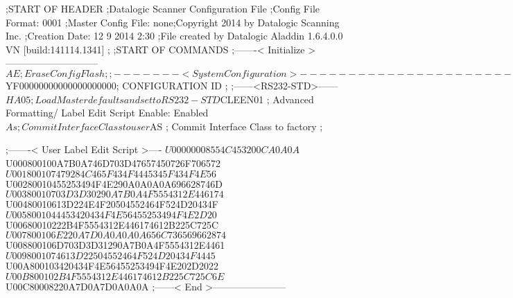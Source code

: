 ;START OF HEADER
;Datalogic Scanner Configuration File
;Config File Format: 0001
;Master Config File: none;Copyright 2014 by Datalogic Scanning Inc.
;Creation Date: 12 9 2014 2:30
;File created by Datalogic Aladdin 1.6.4.0.0 VN [build:141114.1341]
;
;START OF COMMANDS
;-------< Initialize >-----------------------------
$AE                 ; Erase Config Flash
;
;-------< System Configuration >-------------------------------
$YF00000000000000000000; CONFIGURATION ID
;
;------<RS232-STD>------
$HA05               ; Load Master defaults and set to RS232-STD
$CLEEN01            ; Advanced Formatting/ Label Edit Script Enable: Enabled
$As                 ; Commit Interface Class to user
$AS                 ; Commit Interface Class to factory
;

;-------< User Label Edit Script >----
$U00000008554C453200CA0A0A
$U000800100A7B0A746D703D47657450726F706572
$U001800107479284C465F434F4445345F434F4E56
$U00280010455253494F4E290A0A0A0A696628746D
$U00380010703D3D30290A7B0A4F5554312E446174
$U00480010613D224E4F20504552464F524D20434F
$U0058001044453420434F4E56455253494F4E2D20
$U00680010222B4F5554312E446174612B225C725C
$U007800106E220A7D0A0A0A0A656C736569662874
$U008800106D703D3D31290A7B0A4F5554312E4461
$U0098001074613D22504552464F524D20434F4445
$U00A800103420434F4E56455253494F4E202D2022
$U00B800102B4F5554312E446174612B225C725C6E
$U00C80008220A7D0A7D0A0A0A
;------< End >-----------------------
